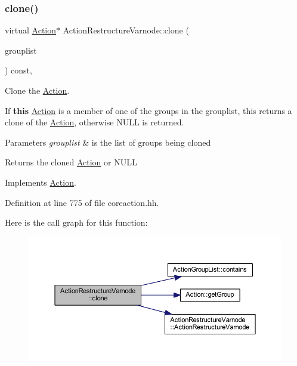 \subsubsection{\texorpdfstring{clone()}{clone()}}
{\footnotesize\ttfamily virtual \mbox{\hyperlink{class_action}{Action}}$\ast$ Action\+Restructure\+Varnode\+::clone (\begin{DoxyParamCaption}\item[{const \mbox{\hyperlink{class_action_group_list}{Action\+Group\+List}} \&}]{grouplist }\end{DoxyParamCaption}) const\hspace{0.3cm}{\ttfamily [inline]}, {\ttfamily [virtual]}}



Clone the \mbox{\hyperlink{class_action}{Action}}. 

If {\bfseries{this}} \mbox{\hyperlink{class_action}{Action}} is a member of one of the groups in the grouplist, this returns a clone of the \mbox{\hyperlink{class_action}{Action}}, otherwise N\+U\+LL is returned. 
\begin{DoxyParams}{Parameters}
{\em grouplist} & is the list of groups being cloned \\
\hline
\end{DoxyParams}
\begin{DoxyReturn}{Returns}
the cloned \mbox{\hyperlink{class_action}{Action}} or N\+U\+LL 
\end{DoxyReturn}


Implements \mbox{\hyperlink{class_action_af8242e41d09e5df52f97df9e65cc626f}{Action}}.



Definition at line 775 of file coreaction.\+hh.

Here is the call graph for this function\+:
\nopagebreak
\begin{figure}[H]
\begin{center}
\leavevmode
\includegraphics[width=350pt]{class_action_restructure_varnode_ad29015bf18989dac6349662f96aa469f_cgraph}
\end{center}
\end{figure}
\mbox{\label{class_action_restructure_varnode_a3dbf44512743482b15794628d8dc40af}} 
